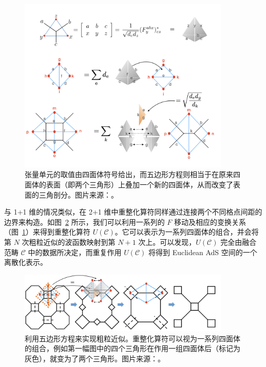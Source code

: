 \begin{figure}[htb]
  \centering
  \includegraphics[width=0.9\textwidth]{images/holographic/tetrahedra-symbols.png}
  \caption[四面体符号]{张量单元的取值由四面体符号给出，而五边形方程则相当于在原来四面体的表面（即两个三角形）上叠加一个新的四面体，从而改变了表面的三角剖分。图片来源：\parencite{chen2022exact}。}
  \label{fig:tetrahedra-symbols}
\end{figure}

与 1+1 维的情况类似，在 2+1 维中重整化算符同样通过连接两个不同格点间距的边界来构造。如图~\ref{fig:rg-2+1d} 所示，我们可以利用一系列的 $F$ 移动及相应的变换关系（图~\ref{fig:tetrahedra-symbols}）来得到重整化算符 $U(\mathcal{C})$\cite{vanhove2018mapping}。它可以表示为一系列四面体的组合，并会将第 $N$ 次粗粒近似的波函数映射到第 $N+1$ 次上。可以发现，$U(\mathcal{C})$ 完全由融合范畴 $\mathcal{C}$ 中的数据所决定，而重复作用 $U(\mathcal{C})$ 将得到 Euclidean AdS 空间的一个离散化表示。

\begin{figure}[htb]
  \centering
  \includegraphics[width=0.9\textwidth]{images/holographic/rg-2+1d.png}
  \caption[利用五边形方程来实现粗粒近似]{利用五边形方程来实现粗粒近似。重整化算符可以视为一系列四面体的组合，例如第一幅图中的四个三角形在作用一组四面体后（标记为灰色），就变为了两个三角形。图片来源：\parencite{chen2022exact}。}
  \label{fig:rg-2+1d}
\end{figure}

